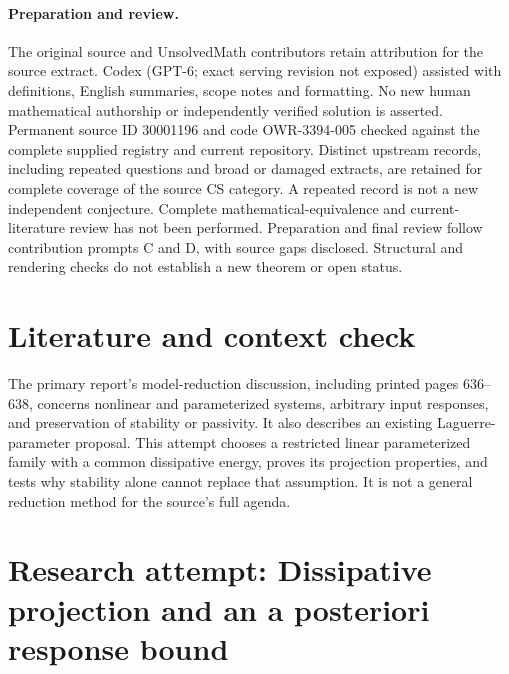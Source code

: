\documentclass[11pt]{article}
\begin{document}
\paragraph{Preparation and review.}
The original source and UnsolvedMath contributors retain attribution for the source extract. Codex (GPT-6; exact serving revision not exposed) assisted with definitions, English summaries, scope notes and formatting. No new human mathematical authorship or independently verified solution is asserted. Permanent source ID 30001196 and code OWR-3394-005 checked against the complete supplied registry and current repository. Distinct upstream records, including repeated questions and broad or damaged extracts, are retained for complete coverage of the source CS category. A repeated record is not a new independent conjecture. Complete mathematical-equivalence and current-literature review has not been performed. Preparation and final review follow contribution prompts C and D, with source gaps disclosed. Structural and rendering checks do not establish a new theorem or open status.
\label{end:30001196}

\section{Literature and context check}
The primary report's model-reduction discussion, including printed pages 636--638, concerns nonlinear and parameterized systems, arbitrary input responses, and preservation of stability or passivity. It also describes an existing Laguerre-parameter proposal. This attempt chooses a restricted linear parameterized family with a common dissipative energy, proves its projection properties, and tests why stability alone cannot replace that assumption. It is not a general reduction method for the source's full agenda.
\section{Research attempt: Dissipative projection and an a posteriori response bound}
\end{document}
